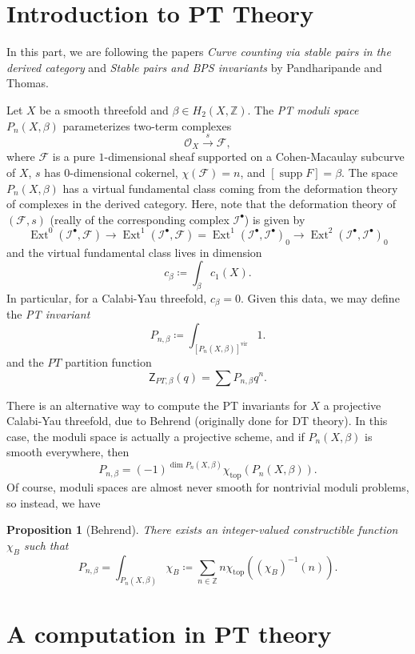 \documentclass{amsart}
\newtheorem{prop}[thm]{Proposition}
\theoremstyle{definition}
\theoremstyle{remark}
\theoremstyle{plain}
\theoremstyle{definition}
\theoremstyle{remark}
\newcommand{\Z}{\mathbb{Z}}
\newcommand{\mc}[1]{\mathcal{#1}}
\newcommand{\mr}[1]{\mathrm{#1}}
\newcommand{\ms}[1]{\mathsf{#1}}
\newcommand{\1}{\mathbf{1}}
\newcommand{\2}{\mathbf{2}}
\newcommand{\3}{\mathbf{3}}
\DeclareMathOperator{\Ext}{Ext}
\DeclareMathOperator{\supp}{supp}
\begin{document}
\section{Introduction to PT Theory}%
\label{sec:introduction_to_pt_theory}

In this part, we are following the papers \textit{Curve counting via stable pairs in the derived category} and \textit{Stable pairs and BPS invariants} by Pandharipande and Thomas.

Let $X$ be a smooth threefold and $\beta \in H_2(X, \Z)$. The \textit{PT moduli space} $P_n(X, \beta)$ parameterizes two-term complexes
\[ \mc{O}_X \xrightarrow{s} \mc{F}, \]
where $\mc{F}$ is a pure $1$-dimensional sheaf supported on a Cohen-Macaulay subcurve of $X$, $s$ has $0$-dimensional cokernel, $\chi(\mc{F}) = n$, and $[\supp F] = \beta$. The space $P_n(X, \beta)$ has a virtual fundamental class coming from the deformation theory of complexes in the derived category. Here, note that the deformation theory of $(\mc{F}, s)$ (really of the corresponding complex $\mc{I}^{\bullet}$) is given by
\[ \Ext^0(\mc{I}^{\bullet}, \mc{F}) \to \Ext^1(\mc{I}^{\bullet}, \mc{F}) = {\Ext^1(\mc{I}^{\bullet}, \mc{I}^{\bullet})}_0 \to {\Ext^2(\mc{I}^{\bullet}, \mc{I}^{\bullet})}_0 \]
and the virtual fundamental class lives in dimension
\[ c_{\beta} \coloneqq \int_{\beta} c_1(X). \]
In particular, for a Calabi-Yau threefold, $c_{\beta} = 0$. Given this data, we may define the \textit{PT invariant}
\[ P_{n, \beta} \coloneqq \int_{{[P_n(X, \beta)]}^{\mr{vir}}} 1. \]
and the $PT$ partition function
\[ \ms{Z}_{PT, \beta}(q) = \sum P_{n, \beta} q^n. \]

There is an alternative way to compute the PT invariants for $X$ a projective Calabi-Yau threefold, due to Behrend (originally done for DT theory). In this case, the moduli space is actually a projective scheme, and if $P_n(X, \beta)$ is smooth everywhere, then
\[ P_{n, \beta} = {(-1)}^{\dim P_n(X, \beta)} \chi_{\mr{top}}(P_n(X, \beta)). \]
Of course, moduli spaces are almost never smooth for nontrivial moduli problems, so instead, we have
\begin{prop}[Behrend]
    There exists an integer-valued constructible function $\chi_B$ such that
    \[ P_{n, \beta} = \int_{P_n(X, \beta)} \chi_B \coloneqq \sum_{n \in \Z} n \chi_{\mr{top}}({(\chi_B)}^{-1}(n)). \]
\end{prop}

\section{A computation in PT theory}%
\label{sec:a_computation_in_pt_theory}
\end{document}
